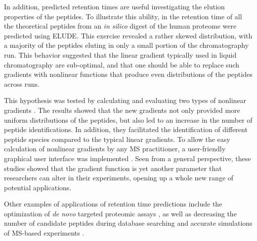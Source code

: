\documentclass[a4paper]{article}
\begin{document}
In addition, predicted retention times are useful investigating the
elution properties of the peptides.  To illustrate this ability, in
\cite{elude1} the retention time of all the theoretical peptides from
an {\it in silico} digest of the human proteome were predicted using
{\sc ELUDE}. This exercise revealed a rather skewed distribution, with
a majority of the peptides eluting in only a small portion of the
chromatography run. This behavior suggested that the linear gradient
typically used in liquid chromatography are sub-optimal, and that one
should be able to replace such gradients with nonlinear functions that
produce even distributions of the peptides across runs.

This hypothesis was tested by calculating and evaluating two types of
nonlinear gradients \cite{gradopt1}. The results showed that the new
gradients not only provided more uniform distributions of the
peptides, but also led to an increase in the number of peptide
identifications. In addition, they facilitated the identification of
different peptide species compared to the typical linear gradients. To
allow the easy calculation of nonlinear gradients by any MS
practitioner, a user-friendly graphical user interface was implemented
\cite{gradopt2}.  Seen from a general perspective, these studies
showed that the gradient function is yet another parameter that
researchers can alter in their experiments, opening up a whole new
range of potential applications.

Other examples of applications of retention time predictions include
the optimization of {\em de novo} targeted proteomic assays
\cite{bertsch2010}, as well as decreasing the number of candidate
peptides during database searching \cite{lobas2013} and accurate
simulations of MS-based experiments \cite{bielow2011}.



 
\end{document}
